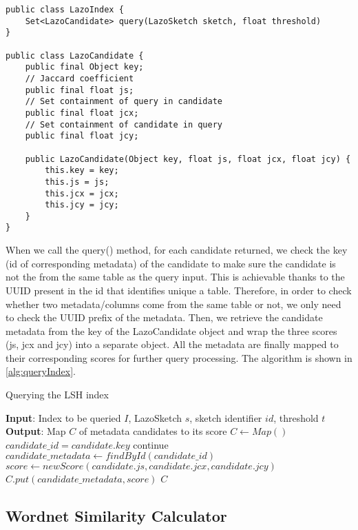 \begin{lstlisting}[caption=The query() method that LazoIndex provided, label=lst:queryIndex]
public class LazoIndex {
    Set<LazoCandidate> query(LazoSketch sketch, float threshold)
}

public class LazoCandidate {
    public final Object key;
    // Jaccard coefficient
    public final float js;
    // Set containment of query in candidate
    public final float jcx;
    // Set containment of candidate in query
    public final float jcy;

    public LazoCandidate(Object key, float js, float jcx, float jcy) {
        this.key = key;
        this.js = js;
        this.jcx = jcx;
        this.jcy = jcy;
    }
}
\end{lstlisting}

When we call the query() method, for each candidate returned, we check the key (id of corresponding metadata) of the candidate to make sure the candidate is not the from the same table as the query input. This is achievable thanks to the UUID present in the id that identifies unique a table. Therefore, in order to check whether two metadata/columns come from the same table or not, we only need to check the UUID prefix of the metadata. Then, we retrieve the candidate metadata from the key of the LazoCandidate object and wrap the three scores (js, jcx and jcy) into a separate object. All the metadata are finally mapped to their corresponding scores for further query processing. The algorithm is shown in \ref{alg:queryIndex}.

\begin{algorithm}
    \caption{Querying the LSH index}
    \label{alg:queryIndex}
    \begin{algorithmic}[1]
\STATE \textbf{Input}: Index to be queried $I$, LazoSketch $s$, sketch identifier $id$, threshold $t$
\STATE \textbf{Output}: Map $C$ of metadata candidates to its score
\STATE $C \gets Map()$
\STATE $candidate\_id = candidate.key$
\STATE continue
\ENDIF
\STATE $candidate\_metadata \gets findById(candidate\_id)$
\STATE $score \gets new Score(candidate.js, candidate.jcx, candidate.jcy)$
\STATE $C.put(candidate\_metadata, score)$
\ENDFOR
\RETURN $C$
    \end{algorithmic}
\end{algorithm}

\subsection{Wordnet Similarity Calculator}

